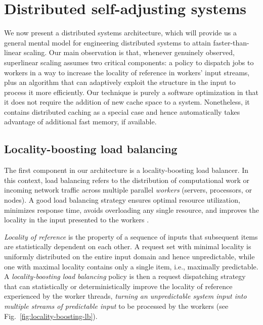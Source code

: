 \section{Distributed self-adjusting systems}
\label{sec:architecture}

We now present a distributed systems architecture, which will provide us a general mental model for engineering distributed systems to attain faster-than-linear scaling. Our main observation is that, whenever genuinely observed, superlinear scaling assumes two critical components: a policy to dispatch jobs to workers in a way to increase the locality of reference in workers' input streams, plus an algorithm that can adaptively exploit the structure in the input to process it more efficiently. Our technique is purely a software optimization in that it does not require the addition of new cache space to a system. Nonetheless, it contains distributed caching as a special case and hence automatically takes advantage of additional fast memory, if available.

\subsection{Locality-boosting load balancing}
\label{sec:lb-lb}

The first component in our architecture is a locality-boosting load balancer.  In this context, load balancing refers to the distribution of computational work or incoming network traffic across multiple parallel \emph{workers} (servers, processors, or nodes). A good load balancing strategy ensures optimal resource utilization, minimizes response time, avoids overloading any single resource, and improves the locality in the input presented to the workers \cite{10.1145/155332.155358}.

\emph{Locality of reference} is the property of a sequence of inputs that subsequent items are statistically dependent on each other. A request set with minimal locality is uniformly distributed on the entire input domain and hence unpredictable, while one with maximal locality contains only a single item, i.e., maximally predictable. A \emph{locality-boosting load balancing} policy is then a request dispatching strategy that can statistically or deterministically improve the locality of reference experienced by the worker threads, \emph{turning an unpredictable system input into multiple streams of predictable input} to be processed by the workers (see Fig.~\ref{fig:locality-boosting-lb}).

